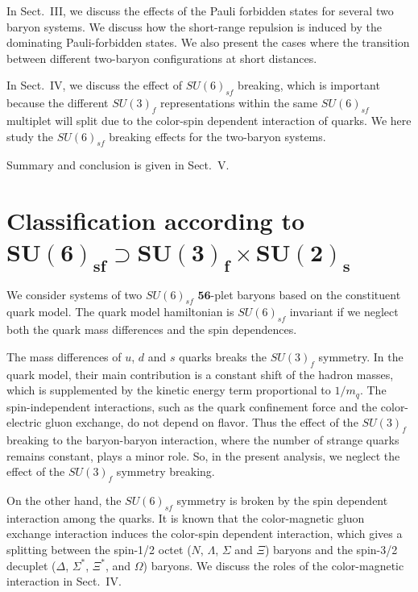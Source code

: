 \documentclass[aps,prd,showpacs,floatfix,reprint,nofootinbib]{revtex4-1}
\newcommand \cc[1]{{\bm {#1}}}
\begin{document}
In Sect.~III, we discuss the 
effects of the Pauli forbidden states for several two baryon systems.
We discuss how the short-range repulsion is induced by the dominating Pauli-forbidden states. 
We also present the cases where the transition between different two-baryon configurations
at short distances.

In Sect.~IV, we discuss the effect of $SU(6)_{sf}$ breaking, which is important because the different 
$SU(3)_f$ representations within the same $SU(6)_{sf}$ multiplet will split due to the color-spin dependent
interaction of quarks.
We here study the $SU(6)_{sf}$ breaking effects for the two-baryon systems.

Summary and conclusion is given in Sect.~V.


\section{Classification according to $\bm{SU(6)_{sf}\supset SU(3)_f\times SU(2)_s}$}

We consider systems of two $SU(6)_{sf}$ $\cc {56}$-plet baryons based on the constituent quark model.
The quark model hamiltonian is $SU(6)_{sf}$ invariant if we neglect both the quark mass differences
and the spin dependences.

The mass differences of $u$, $d$ and $s$ quarks breaks the $SU(3)_f$ symmetry.
In the quark model, their main contribution is a constant shift of
the hadron masses, which is supplemented by the kinetic energy term proportional to $1/m_q$.
The spin-independent interactions, such as the quark confinement force and the color-electric gluon exchange,
do not depend on flavor.
Thus the effect of the $SU(3)_f$ breaking to the baryon-baryon interaction, 
where the number of strange quarks remains constant, plays a minor role.
So, in the present analysis, we neglect the effect of the $SU(3)_f$ symmetry breaking.

On the other hand, the $SU(6)_{sf}$ symmetry is broken by the spin dependent interaction among the quarks.
It is known that the color-magnetic gluon exchange interaction induces the color-spin dependent interaction, which
gives a splitting between the spin-1/2 octet ($N$, $\Lambda$, $\Sigma$ and $\Xi$) baryons and 
the spin-3/2 decuplet ($\Delta$, $\Sigma^*$, $\Xi^*$, and $\Omega$) baryons. 
We discuss the roles of the color-magnetic interaction in Sect.~IV.


\end{document}
